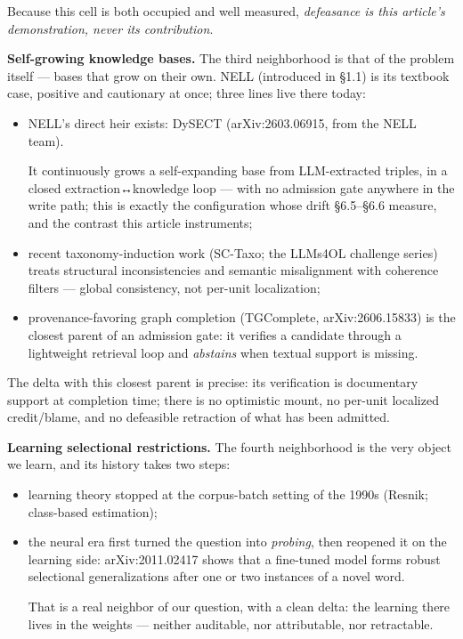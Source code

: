 \documentclass[11pt]{article}
\begin{document}
Because this cell is both occupied and well measured, \emph{defeasance is this article's demonstration, never its contribution}.

\textbf{Self-growing knowledge bases.} The third neighborhood is that of the problem itself — bases that grow on their own. NELL (introduced in §1.1) is its textbook case, positive and cautionary at once; three lines live there today:

\begin{itemize}
\item NELL's direct heir exists: DySECT (arXiv:2603.06915, from the NELL team). \par It continuously grows a self-expanding base from LLM-extracted triples, in a closed extraction↔knowledge loop — with no admission gate anywhere in the write path; this is exactly the configuration whose drift §6.5–§6.6 measure, and the contrast this article instruments;

\item recent taxonomy-induction work (SC-Taxo; the LLMs4OL challenge series) treats structural inconsistencies and semantic misalignment with coherence filters — global consistency, not per-unit localization;
\item provenance-favoring graph completion (TGComplete, arXiv:2606.15833) is the closest parent of an admission gate: it verifies a candidate through a lightweight retrieval loop and \emph{abstains} when textual support is missing.
\end{itemize}

The delta with this closest parent is precise: its verification is documentary support at completion time; there is no optimistic mount, no per-unit localized credit/blame, and no defeasible retraction of what has been admitted.

\textbf{Learning selectional restrictions.} The fourth neighborhood is the very object we learn, and its history takes two steps:

\begin{itemize}
\item learning theory stopped at the corpus-batch setting of the 1990s (Resnik; class-based estimation);
\item the neural era first turned the question into \emph{probing}, then reopened it on the learning side: arXiv:2011.02417 shows that a fine-tuned model forms robust selectional generalizations after one or two instances of a novel word. \par That is a real neighbor of our question, with a clean delta: the learning there lives in the weights — neither auditable, nor attributable, nor retractable.
\end{itemize}
\end{document}
